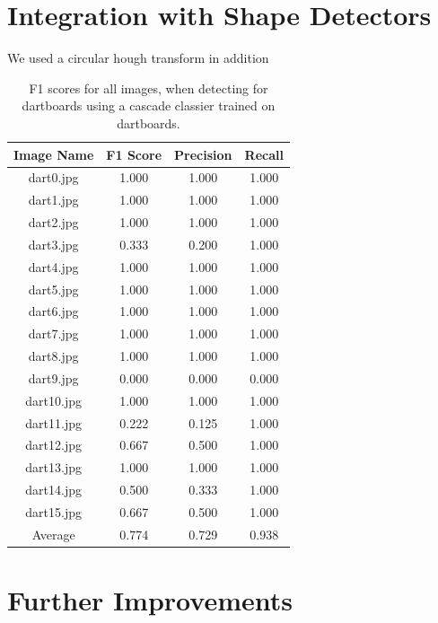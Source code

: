 \documentclass[conference]{IEEEtran}
\begin{document}
\section{Integration with Shape Detectors}
We used a circular hough transform in addition
\begin{table}[htp]
\caption{F1 scores for all images, when detecting for dartboards using a cascade classier trained on dartboards.}
\begin{center}
\begin{tabular}{||c|c|c|c||}
\hline
Image Name			 	& F1 Score 	& Precision	& Recall            \\ \hline
dart0.jpg					& 1.000		&	1.000	& 1.000		\\
dart1.jpg					& 1.000		&	1.000	& 1.000		\\
dart2.jpg					& 1.000		&	1.000	& 1.000		\\
dart3.jpg					& 0.333		&	0.200	& 1.000		\\
dart4.jpg					& 1.000		&	1.000	& 1.000		\\
dart5.jpg					& 1.000		&	1.000	& 1.000		\\
dart6.jpg					& 1.000		&	1.000	& 1.000		\\
dart7.jpg					& 1.000		&	1.000	& 1.000		\\
dart8.jpg					& 1.000		&	1.000	& 1.000		\\
dart9.jpg					& 0.000		&	0.000	& 0.000		\\
dart10.jpg					& 1.000		&	1.000	& 1.000		\\
dart11.jpg					& 0.222		&	0.125	& 1.000		\\
dart12.jpg					& 0.667		&	0.500	& 1.000		\\
dart13.jpg					& 1.000		&	1.000	& 1.000		\\
dart14.jpg					& 0.500		&	0.333	& 1.000		\\
dart15.jpg					& 0.667		&	0.500	& 1.000		\\ \hline



Average 		 			& 0.774		&	0.729	& 0.938 		\\ \hline
\end{tabular}
\end{center}
\label{default}
\end{table}%





\newpage
\section{Further Improvements}
\end{document}
